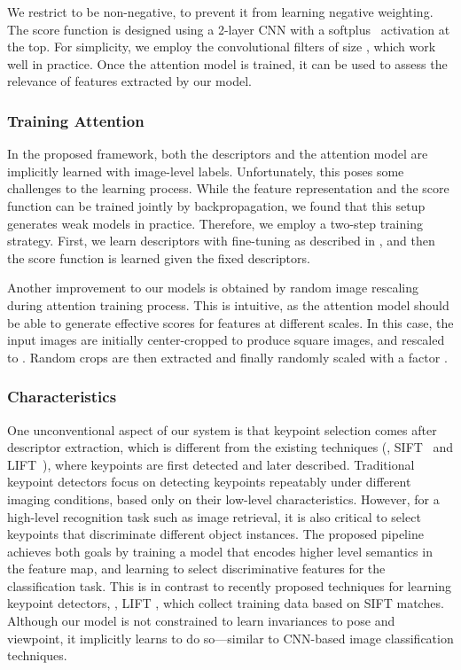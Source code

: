 \documentclass[10pt,twocolumn,letterpaper]{article}
\begin{document}
We restrict  to be non-negative, to prevent it from learning negative weighting.
The score function is designed using a 2-layer CNN with a softplus~\cite{dugas2001incorporating} activation at the top.
For simplicity, we employ the convolutional filters of size , which work well in practice.
Once the attention model is trained, it can be used to assess the relevance of features extracted by our model.


\subsubsection{Training Attention}

In the proposed framework, both the descriptors and the attention model are implicitly learned with image-level labels.
Unfortunately, this poses some challenges to the learning process.
While the feature representation and the score function can be trained jointly by
backpropagation, we found that this setup generates weak models in practice.
Therefore, we employ a two-step training strategy.
First, we learn descriptors with fine-tuning as described in , and then the score function is learned given the fixed descriptors.

Another improvement to our models is obtained by random image rescaling during attention training process.
This is intuitive, as the attention model should be able to generate effective scores for features at different scales.
In this case, the input images are initially center-cropped to produce square images, and rescaled
to .
Random  crops are then extracted and finally randomly scaled with a factor .


\subsubsection{Characteristics}

One unconventional aspect of our system is that keypoint selection comes after descriptor extraction, which is different from the existing techniques (\eg, SIFT~\cite{Lowe2004} and LIFT~\cite{yi2016lift}), where keypoints are first detected and later described.
Traditional keypoint detectors focus on detecting keypoints repeatably under different imaging conditions, based only on their low-level characteristics.
However, for a high-level recognition task such as image retrieval, it is also critical to select keypoints that discriminate different object instances.
The proposed pipeline achieves both goals by training a model that encodes higher level semantics in the feature map, and learning to select discriminative features for the classification task. 
This is in contrast to recently proposed techniques for learning keypoint detectors, \ie, LIFT \cite{yi2016lift}, which collect training data based on SIFT matches.
Although our model is not constrained to learn invariances to pose and viewpoint, it implicitly learns to do so---similar to CNN-based image classification techniques.
\end{document}
